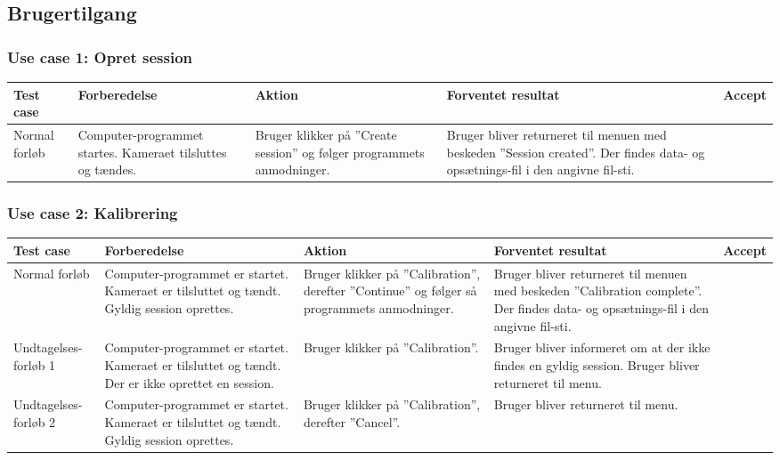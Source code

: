 \documentclass[accepttest.tex]{subfiles}
\begin{document}
\subsection{Brugertilgang}
\subsubsection{Use case 1: Opret session}

\begin{table}[H]
	\small
\begin{tabular}{|p{2cm}|p{3cm}|p{3cm}|p{3cm}|l|}
	\hline Test case & Forberedelse & Aktion & Forventet resultat & Accept \\ 
	\hline Normal forløb & Computer-programmet startes.  Kameraet tilsluttes og tændes.  & Bruger klikker på ”Create session” og følger programmets anmodninger. & Bruger bliver returneret til menuen med beskeden ”Session created”. Der findes data- og opsætnings-fil i den angivne fil-sti. &  \\ 
	\hline 
\end{tabular} 
\end{table}

\subsubsection{Use case 2: Kalibrering}
\begin{table}[H]
	\small
\begin{tabular}{|p{2cm}|p{3cm}|p{3cm}|p{3cm}|l|}
	\hline Test case & Forberedelse & Aktion & Forventet resultat & Accept \\ 
	\hline Normal forløb & Computer-programmet er startet. Kameraet er tilsluttet og tændt. 
	Gyldig session oprettes. & Bruger klikker på ”Calibration”, derefter ”Continue” og følger så programmets anmodninger. & Bruger bliver returneret til menuen med beskeden ”Calibration complete”. Der findes data- og opsætnings-fil i den angivne fil-sti. & \\
	
	\hline Undtagelses-forløb 1 & Computer-programmet er startet. Kameraet er tilsluttet og tændt. Der er ikke oprettet en session. & Bruger klikker på ”Calibration”. & Bruger bliver informeret om at der ikke findes en gyldig session. Bruger bliver returneret til menu. &\\
	\hline Undtagelses-forløb 2 & Computer-programmet er startet. Kameraet er tilsluttet og tændt. 
	Gyldig session oprettes. & Bruger klikker på ”Calibration”, derefter ”Cancel”. & Bruger bliver returneret til menu. & \\
		\hline 
\end{tabular}
\end{table}
\end{document}
